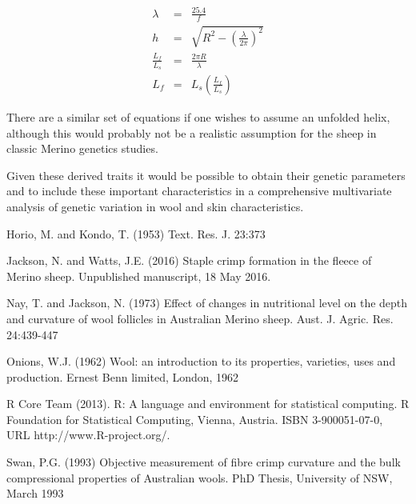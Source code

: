 \documentclass[titlepage]{article}  %
\begin{document}
\begin{eqnarray}
\lambda & = & \frac{25.4}{f} \\
h       & = & \sqrt{R^{2} - \left(\frac{\lambda}{2\pi}\right)^{2}} \\
\frac{L_{f}}{L_{s}} & = & \frac{2\pi R}{\lambda}\\
L_{f} & = & L_{s} \left(\frac{L_{f}}{L_{s}}\right)
\end{eqnarray}

There are a similar set of equations if one wishes to assume an unfolded helix, although this would probably not be a realistic assumption for the sheep in classic Merino genetics studies.

Given these derived traits it would be possible to obtain their genetic parameters and to include these important characteristics in a comprehensive multivariate analysis of genetic variation in wool and skin characteristics.

\begin{thebibliography}{99}

Horio, M. and Kondo, T. (1953) Text. Res. J. 23:373

Jackson, N. and Watts, J.E. (2016) Staple crimp formation in the fleece of Merino sheep. Unpublished manuscript, 18 May 2016.

Nay, T. and Jackson, N. (1973) Effect of changes in nutritional level on the depth and curvature of wool follicles in Australian Merino sheep. Aust. J. Agric. Res. 24:439-447

Onions, W.J. (1962) Wool: an introduction to its properties, varieties, uses
     and production. Ernest Benn limited, London, 1962

R Core Team (2013). R: A language and environment for statistical
  computing. R Foundation for Statistical Computing, Vienna, Austria.
  ISBN 3-900051-07-0, URL http://www.R-project.org/.

Swan, P.G. (1993) Objective measurement of fibre crimp curvature and the bulk compressional properties of Australian wools. PhD Thesis, University of NSW, March 1993 

\end{thebibliography}
\end{document}
